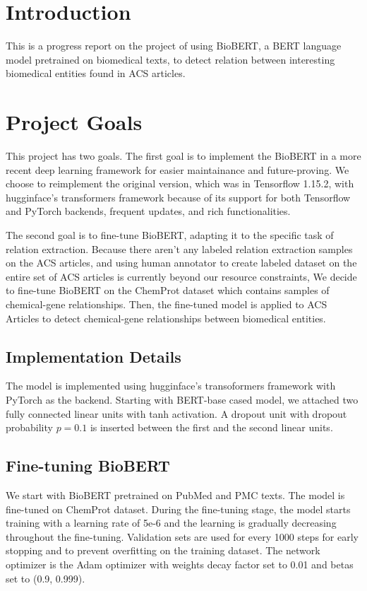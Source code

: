 \documentclass{article}
\begin{document}
\section{Introduction}

This is a progress report on the project of using BioBERT, a BERT language model pretrained on biomedical texts, to
detect relation between interesting biomedical entities found in ACS articles.

\section{Project Goals} 

This project has two goals. The first goal is to implement the BioBERT in a more recent deep learning framework for
easier maintainance and future-proving. We choose to reimplement the original version, which was in Tensorflow
1.15.2, with hugginface's transformers framework because of its support for both Tensorflow and PyTorch backends,
frequent updates, and rich functionalities.

The second goal is to fine-tune BioBERT, adapting it to the specific task of relation extraction. Because there
aren't any labeled relation extraction samples on the ACS articles, and using human annotator to create labeled
dataset on the entire set of ACS articles is currently beyond our resource constraints, We decide to fine-tune
BioBERT on the ChemProt dataset which contains samples of chemical-gene relationships. Then, the fine-tuned model is
applied to ACS Articles to detect chemical-gene relationships between biomedical entities.

\subsection{Implementation Details}

The model is implemented using hugginface's transoformers framework with PyTorch as the backend. Starting with
BERT-base cased model, we attached two fully connected linear units with tanh activation. A dropout unit with dropout
probability $p=0.1$ is inserted between the first and the second linear units.

\subsection{Fine-tuning BioBERT}

We start with BioBERT pretrained on PubMed and PMC texts. The model is fine-tuned on ChemProt dataset. During the
fine-tuning stage, the model starts training with a learning rate of 5e-6 and the learning is gradually decreasing
throughout the fine-tuning. Validation sets are used for every 1000 steps for early stopping and to prevent
overfitting on the training dataset. The network optimizer is the Adam optimizer with weights decay factor set to
0.01 and betas set to (0.9, 0.999).
\end{document}
